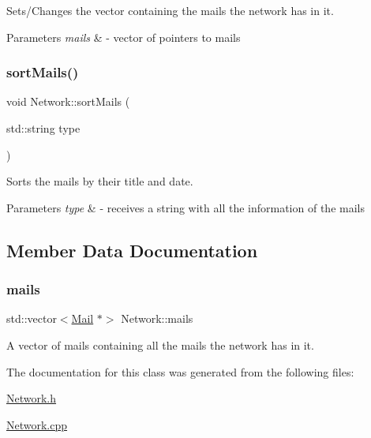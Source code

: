 Sets/\+Changes the vector containing the mails the network has in it. 


\begin{DoxyParams}{Parameters}
{\em mails} & -\/ vector of pointers to mails \\
\hline
\end{DoxyParams}
\mbox{\label{classNetwork_ab7eb46f37b172f7e7281ad5d27cb0ba0}} 
\subsubsection{\texorpdfstring{sort\+Mails()}{sortMails()}}
{\footnotesize\ttfamily void Network\+::sort\+Mails (\begin{DoxyParamCaption}\item[{std\+::string}]{type }\end{DoxyParamCaption})}



Sorts the mails by their title and date. 


\begin{DoxyParams}{Parameters}
{\em type} & -\/ receives a string with all the information of the mails \\
\hline
\end{DoxyParams}


\subsection{Member Data Documentation}
\mbox{\label{classNetwork_a7d870918668129e7853c5374785955b1}} 
\subsubsection{\texorpdfstring{mails}{mails}}
{\footnotesize\ttfamily std\+::vector$<$\mbox{\hyperlink{classMail}{Mail}} $\ast$$>$ Network\+::mails\hspace{0.3cm}{\ttfamily [private]}}



A vector of mails containing all the mails the network has in it. 



The documentation for this class was generated from the following files\+:\begin{DoxyCompactItemize}
\item 
\mbox{\hyperlink{Network_8h}{Network.\+h}}\item 
\mbox{\hyperlink{Network_8cpp}{Network.\+cpp}}\end{DoxyCompactItemize}
